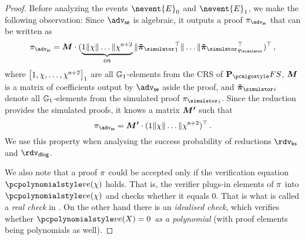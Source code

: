 \documentclass[runningheads,11pt]{llncs}
\let\spvec\vec
\let\vec\accentvec
\let\vec\spvec
\def\vec#1{\mathchoice{\mbox{\boldmath$\displaystyle#1$}}
	{\mbox{\boldmath$\textstyle#1$}}
	{\mbox{\boldmath$\scriptstyle#1$}}
	{\mbox{\boldmath$\scriptscriptstyle#1$}}}
\theoremstyle{definition}
\begin{document}
\begin{proof}
	Before analyzing the events $\nevent{E}_0$ and $\nevent{E}_1$, we make the following observation:
	Since $\advse$ is algebraic, it outputs a proof $\zkproof_\advse$ that can be written as 
	\[
		\zkproof_\advse = \vec{M} \cdot (\underbrace{1 \| \chi \| \ldots \| \chi^{\numberofconstrains + 2}}_{\crs} \| \vec{\tilde{\zkproof}_\simulator}_1^{\top} \| \ldots \| \vec{\tilde{\zkproof}_\simulator}_{q_\simulator}^\top)^\top\,,
	\]
	where $\left[1, \chi, \ldots, \chi^{\mathsf{n} + 2}\right]_{1}$ are all $\mathbb{G}_1$-elements from the CRS of $\plonkprotfs$, $\vec{M}$ is a matrix of coefficients output by $\advse$ aside the proof, and $\vec{\tilde{\zkproof}_\simulator}_i$ denote all $\mathbb{G}_1$-elements from the simulated proof ${\zkproof_\simulator}_i$. 
	Since the reduction provides the simulated proofs, it knows a matrix $\vec{M'}$ such that
	\begin{equation}
		\label{eq:M_prim}
		\zkproof_\advse = \vec{M'} \cdot (1 \| \chi \| \ldots \| \chi^{\numberofconstrains + 2})^\top\,.
	\end{equation}
	We use this property when analysing the success probability of reductions $\rdvks$ and $\rdvdlog$.
	
	We also note that a proof $\pi$ could be accepted only if the verification equation $\vereq(\chi)$ holds. That is, the verifier plugs-in elements of $\pi$ into $\vereq(\chi)$ and checks whether it equals $0$. That is what is called a \emph{real check} in \cite{EPRINT:GabWilCio19}. 
	On the other hand there is an \emph{idealised check}, which verifies whether $\vereq(X) = 0$ \emph{as a polynomial} (with proof elements being polynomials as well).


\end{proof}
\end{document}
